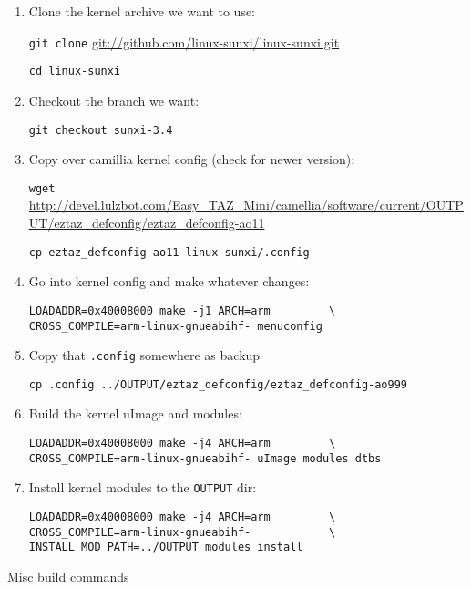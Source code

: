 \begin{enumerate}
  \item{Clone the kernel archive we want to use:
  
  \verb|git clone| \url{git://github.com/linux-sunxi/linux-sunxi.git}
  
  \verb|cd linux-sunxi|
  }

  \item{Checkout the branch we want:
  
  \verb|git checkout sunxi-3.4|
  }

  \item{Copy over camillia kernel config (check for newer version):
  
  \verb|wget| \url{http://devel.lulzbot.com/Easy_TAZ_Mini/camellia/software/current/OUTPUT/eztaz_defconfig/eztaz_defconfig-ao11}
  
  \verb|cp eztaz_defconfig-ao11 linux-sunxi/.config|
  }

  \item{Go into kernel config and make whatever changes:

  \begin{verbatim}
LOADADDR=0x40008000 make -j1 ARCH=arm         \
CROSS_COMPILE=arm-linux-gnueabihf- menuconfig
  \end{verbatim}
  }

  \item{Copy that \verb|.config| somewhere as backup
  
  \verb|cp .config ../OUTPUT/eztaz_defconfig/eztaz_defconfig-ao999|
  }

  \item{Build the kernel uImage and modules:
  
  \begin{verbatim}
LOADADDR=0x40008000 make -j4 ARCH=arm         \
CROSS_COMPILE=arm-linux-gnueabihf- uImage modules dtbs
  \end{verbatim}
  }

  \item{Install kernel modules to the \texttt{OUTPUT} dir:

  \begin{verbatim}
LOADADDR=0x40008000 make -j4 ARCH=arm         \
CROSS_COMPILE=arm-linux-gnueabihf-            \
INSTALL_MOD_PATH=../OUTPUT modules_install
  \end{verbatim}
  }

\end{enumerate}


Misc build commands

